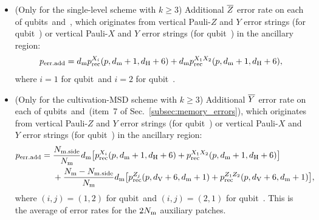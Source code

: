 \documentclass[
 prx,
 reprint,
 superscriptaddress,
 longbibliography,
 dvipsnames
]{revtex4-2}
\begin{document}
\begin{widetext}
\begin{itemize}
    \begin{align*}
        p_\mr{err.add} = \dm \plogrec{Z_1 Z_2} (p, \dV + 6, \dz'),
    \end{align*}
    where $\dz' = \dout + 1$ for the output qubit and $\dz' = \dz$ for the validation qubits.
    \item (Only for the single-level scheme with $k \geq 3$) Additional $\overline{Z}$ error rate on each of qubits~\talpha and~\tbeta, which originates from vertical Pauli-$Z$ and $Y$ error strings (for qubit~\talpha) or vertical Pauli-$X$ and $Y$ error strings (for qubit~\tbeta) in the ancillary region:
    \begin{align*}
        p_{\mathrm{err.add}} = d_{\mathrm{m}} p_{\mathrm{rec}}^{X_i} (p, d_{\mathrm{m}} + 1, d_{\mathrm{H}} + 6) + d_{\mathrm{m}} p_{\mathrm{rec}}^{X_1 X_2} (p, d_{\mathrm{m}} + 1, d_{\mathrm{H}} + 6),
    \end{align*}
    where $i=1$ for qubit~\talpha and $i=2$ for qubit~\tbeta.
    \item (Only for the cultivation-MSD scheme with $k \geq 3$) Additional $\overline{Y}$ error rate on each of qubits~\talpha and~\tbeta (item~7 of Sec.~\ref{subsec:memory_errors}), which originates from vertical Pauli-$Z$ and $Y$ error strings (for qubit~\talpha) or vertical Pauli-$X$ and $Y$ error strings (for qubit~\tbeta) in the ancillary region:
    \begin{align*}
        p_{\mathrm{err.add}} ={} &\frac{N_{\mathrm{m.side}}}{N_{\mathrm{m}}} d_{\mathrm{m}} \qty[p_{\mathrm{rec}}^{X_i} (p, d_{\mathrm{m}} + 1, d_{\mathrm{H}} + 6) + p_{\mathrm{rec}}^{X_1 X_2} (p, d_{\mathrm{m}} + 1, d_{\mathrm{H}} + 6)] \\
        &+ \frac{N_{\mathrm{m}} - N_{\mathrm{m.side}}}{N_{\mathrm{m}}} d_{\mathrm{m}} \qty[p_{\mathrm{rec}}^{Z_j} (p, d_{\mathrm{V}} + 6, d_{\mathrm{m}} + 1) + p_{\mathrm{rec}}^{Z_1 Z_2} (p, d_{\mathrm{V}} + 6, d_{\mathrm{m}} + 1)],
    \end{align*}
    where $(i, j) = (1, 2)$ for qubit~\talpha and $(i, j) = (2, 1)$ for qubit~\tbeta.
    This is the average of error rates for the $2N_{\mathrm{m}}$ auxiliary patches.
\end{itemize}


\end{widetext}
\end{document}

